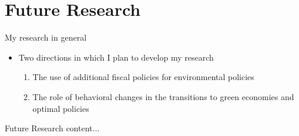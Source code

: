 \section{Future Research}
\begin{frame}{My research in general}
	
	\begin{itemize}[<+-| alert@+>]
		\item Two directions in which I plan to develop my research
		\begin{enumerate}
			\item The use of additional fiscal policies for environmental policies
			\item The role of behavioral changes in the transitions to green economies and optimal policies
		\end{enumerate}
	\end{itemize}
\end{frame}

\begin{frame}{Future Research}
	content...
\end{frame}